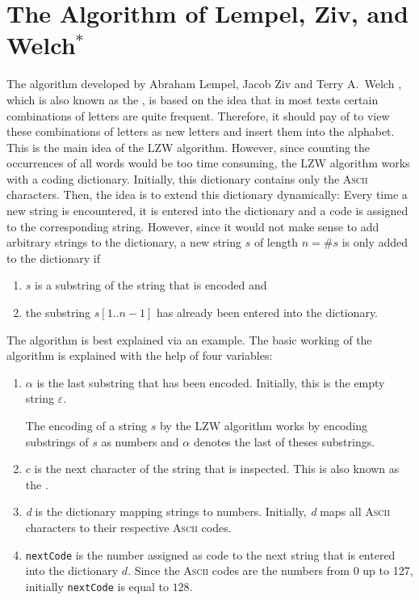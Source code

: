 \section[LZW Algorithm$^*$]{The Algorithm  of Lempel, Ziv, and Welch$^*$}
The algorithm developed by Abraham Lempel, Jacob Ziv \cite{ziv:77,ziv:78} and Terry A.~Welch
\cite{welch:84}, which is also known as the , is based on the idea that in most
texts certain combinations of letters are quite frequent.  Therefore, it should pay of to view
these combinations of letters as new letters and insert them into the alphabet.  This is the main
idea of the LZW algorithm.  However, since counting the occurrences of all words would be too time
consuming, the LZW algorithm works with a  coding dictionary.  Initially, this dictionary
contains only the \textsc{Ascii} characters.  Then, the idea is to extend this dictionary
dynamically: Every time a new string is encountered, it is entered into the dictionary and a code is
assigned to the corresponding string.  However, since it would not make sense to add arbitrary
strings to the dictionary, a new string $s$ of length $n=\#s$ is only added to the dictionary if
\begin{enumerate}
\item $s$ is a substring of the string that is encoded and
\item the substring $s[1..n-1]$ has already been entered into the dictionary.  
\end{enumerate} 
The algorithm is best
explained via an example.  The basic working of the algorithm is explained with the help of four
variables:
\begin{enumerate}
\item $\alpha$ is the last substring that has been encoded.  Initially, this is the empty string
      $\varepsilon$.
  
      The encoding of a string $s$ by the LZW algorithm works by encoding substrings of $s$ as
      numbers and $\alpha$ denotes the last of theses substrings.
\item $c$ is the next character of the string that is inspected.  This is also known as the
      .
\item \textsl{d} is the dictionary mapping strings to numbers.  Initially, \textsl{d} maps all
      \textsc{Ascii} characters to their respective \textsc{Ascii} codes.
\item \texttt{nextCode} is the number assigned as code to the next string that is entered into
      the dictionary $d$.  Since the \textsc{Ascii} codes are the numbers from 0 up to 127,
      initially \texttt{nextCode} is equal to $128$.
\end{enumerate}
